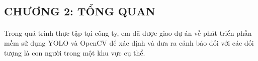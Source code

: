 \begin{flushleft}
    \fontsize{16}{20}\selectfont
    \section*{CHƯƠNG 2: TỔNG QUAN}
    \fontsize{13}{20}\selectfont
    \paragraph{}
    \fontsize{13}{20}\selectfont Trong quá trình thực tập tại công ty, em đã được giao dự án về phát triển phần mềm sử dụng YOLO và OpenCV để xác định và đưa ra cảnh báo đối với các đối tượng là con người trong một khu vực cụ thể.\\
    \setcounter{section}{2}
    \setcounter{subsection}{0}

\end{flushleft}
